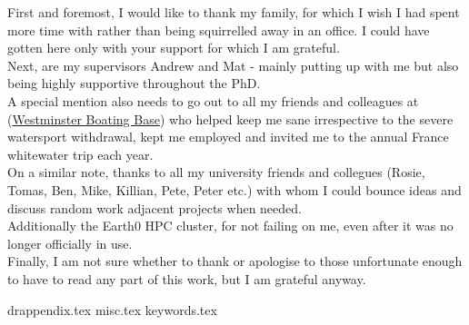 \documentclass[twoside,openleft,reqno,a4paper,final]{book}
\newcommand{\chapterbib}{
\newpage


}
\begin{document}
\parbox{.75\textwidth}{
 First and foremost, I would like to thank my family, for which I wish I had spent more time with rather than being squirrelled away in an office. I could have gotten here only with your support for which I am grateful.\\

 Next, are my supervisors Andrew and Mat - mainly putting up with me but also being highly supportive throughout the PhD.\\

 A special mention also needs to go out to all my friends and colleagues at (\href{www.westminsterboatingbase.co.uk} {Westminster Boating Base}) who helped keep me sane irrespective to the severe watersport withdrawal, kept me employed and invited me to the annual France whitewater trip each year.\\

 On a similar note, thanks to all my university friends and collegues  (Rosie, Tomas, Ben, Mike, Killian, Pete, Peter etc.) with whom I could bounce ideas and discuss random work adjacent projects when needed.\\

 Additionally the Earth0 HPC cluster, for not failing on me, even after it was no longer officially in use.\\

 Finally, I am not sure whether to thank or apologise to those unfortunate enough to have to read any part of this work, but I am grateful anyway.\\

}



\tableofcontents
\listoffigures
\listoftables
\newpage
\mainmatter





 
%

%


%
 

 
%
%
 
%

\cleardoublepage\makeatletter\@openrightfalse\makeatother
\begin{appendices}
{drappendix.tex}
{misc.tex}
{keywords.tex}

\end{appendices}




\newpage
%
%
%
\end{document}

